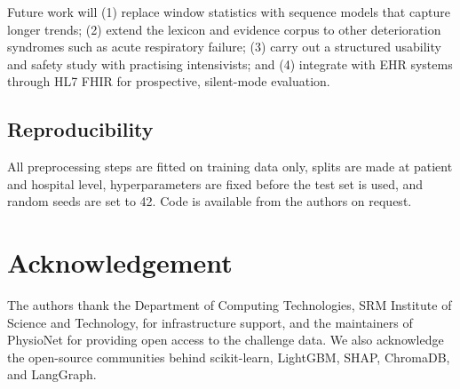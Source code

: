 \documentclass[conference]{IEEEtran}
\begin{document}
Future work will (1) replace window statistics with sequence models that
capture longer trends; (2) extend the lexicon and evidence corpus to other
deterioration syndromes such as acute respiratory failure; (3) carry out a
structured usability and safety study with practising intensivists; and
(4) integrate with EHR systems through HL7 FHIR for prospective, silent-mode
evaluation.

\subsection*{Reproducibility}
All preprocessing steps are fitted on training data only, splits are made
at patient and hospital level, hyperparameters are fixed before the test
set is used, and random seeds are set to 42. Code is available from the
authors on request.

\section*{Acknowledgement}
The authors thank the Department of Computing Technologies, SRM Institute
of Science and Technology, for infrastructure support, and the maintainers
of PhysioNet for providing open access to the challenge data. We also
acknowledge the open-source communities behind scikit-learn, LightGBM,
SHAP, ChromaDB, and LangGraph.



\end{document}
